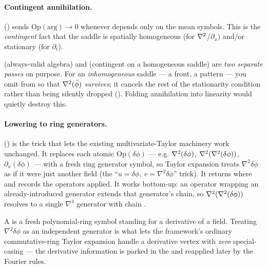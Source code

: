 \paragraph{Contingent annihilation.}
() sends $\mathrm{Op}(\text{arg})\to0$
whenever  depends only on the mean symbols. This is the
\emph{contingent} fact that the saddle is spatially homogeneous (for
$\nabla^2$/$\partial_{x}$) and/or stationary (for $\partial_{t}$).

\begin{gotcha}
 (always-valid algebra) and  (contingent
on a homogeneous saddle) are \emph{two separate passes} on purpose. For an
\emph{inhomogeneous} saddle --- a front, a pattern --- you omit  from
 so that $\nabla^2(\bar\phi)$ \emph{survives}; it cancels the rest of the
stationarity condition rather than being silently dropped
(). Folding annihilation into linearity
would quietly destroy this.
\end{gotcha}

\paragraph{Lowering to ring generators.}
() is the trick that lets the existing
multivariate-Taylor  machinery work unchanged. It replaces each
atomic $\mathrm{Op}(\delta\phi)$ --- e.g. $\nabla^2(\delta\phi)$,
$\nabla^2(\nabla^2(\delta\phi))$, $\partial_{x}(\delta\phi)$ --- with a fresh ring
generator symbol, so Taylor expansion treats $\nabla^{2}\delta\phi$ as if it
were just another field (the ``$u=\delta\phi,\ v=\nabla^{2}\delta\phi$'' trick).
It returns  where 
and  records the operators applied. It works bottom-up: an
operator wrapping an already-introduced generator extends that generator's chain,
so $\nabla^2(\nabla^2(\delta\phi))$ resolves to a single $\nabla^{4}$ generator with
chain .

\begin{defn}
A  is a fresh polynomial-ring symbol standing for a
derivative of a field. Treating $\nabla^{2}\delta\phi$ as an independent
generator is what lets the framework's ordinary commutative-ring Taylor
expansion handle a derivative vertex with \emph{zero} special-casing --- the
derivative information is parked in the  and reapplied later by the
Fourier rules.
\end{defn}

